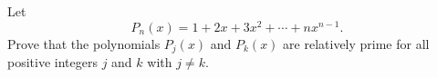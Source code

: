 Let
\[
P_n(x) = 1 + 2 x  + 3 x^2 + \cdots + n x^{n-1}.
\]
Prove that the polynomials $P_j(x)$
and $P_k(x)$ are relatively prime
for all positive integers $j$ and $k$ with $j \neq k$.
